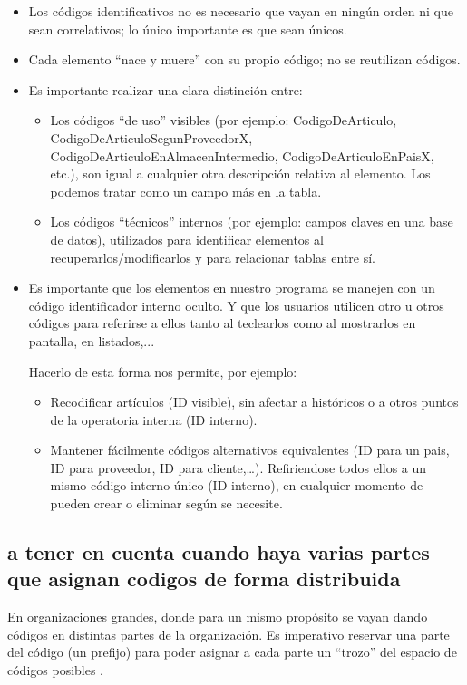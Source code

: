 \documentclass[spanish,12pt,a4paper,final,oneside]{book}
\begin{document}
\begin{itemize}

\item Los códigos identificativos no es necesario que vayan en ningún orden ni que sean correlativos; lo único importante es que sean únicos.

\item Cada elemento ``nace y muere'' con su propio código; no se reutilizan códigos.


\item Es importante realizar una clara distinción entre:

\begin{itemize}

\item Los códigos ``de uso'' visibles (por ejemplo: CodigoDeArticulo, CodigoDeArticuloSegunProveedorX, CodigoDeArticuloEnAlmacenIntermedio, CodigoDeArticuloEnPaisX, etc.), son igual a cualquier otra descripción relativa al elemento. Los podemos tratar como un campo más en la tabla.

\item Los códigos ``técnicos'' internos (por ejemplo: campos claves en una base de datos), utilizados para identificar elementos al recuperarlos/modificarlos y para relacionar tablas entre sí.

\end{itemize}

\item Es importante que los elementos en nuestro programa se manejen con un código identificador interno oculto. Y que los usuarios utilicen otro u otros códigos para referirse a ellos tanto al teclearlos como al mostrarlos en pantalla, en listados,...

Hacerlo de esta forma nos permite, por ejemplo:
\begin{itemize}
\item Recodificar artículos (ID visible), sin afectar a históricos o a otros puntos de la operatoria interna (ID interno).
\item Mantener fácilmente códigos alternativos equivalentes (ID para un pais, ID para proveedor, ID para cliente,\ldots). Refiriendose todos ellos a un mismo  código interno único (ID interno), en cualquier momento de pueden crear o eliminar según se necesite.
\end{itemize}

\end{itemize}


\subsection{a tener en cuenta cuando haya varias partes que asignan codigos de forma distribuida}
En organizaciones grandes, donde para un mismo propósito se vayan dando códigos en distintas partes de la organización. Es imperativo reservar una parte del código (un prefijo) para poder asignar a cada parte un ``trozo'' del espacio de códigos posibles .
\end{document}
